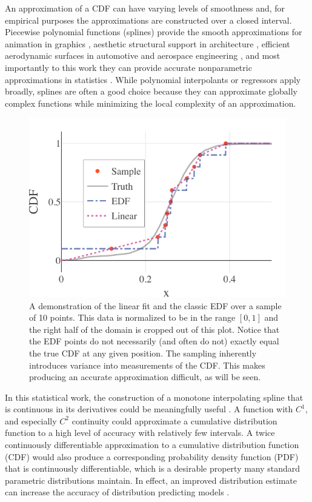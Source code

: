 \documentclass[letterpaper, 10 pt, conference]{ieeeconf}  %
\begin{document}
An approximation of a CDF can have varying levels of smoothness and, for empirical purposes the approximations are constructed over a closed interval. Piecewise polynomial functions (splines) provide the smooth approximations for animation in graphics \cite{herman2015techniques,quint2003scalable}, aesthetic structural support in architecture \cite{brennan2019measure}, efficient aerodynamic surfaces in automotive and aerospace engineering \cite{brennan2019measure}, and most importantly to this work they can provide accurate nonparametric approximations in statistics \cite{knott2012interpolating}. While polynomial interpolants or regressors apply broadly, splines are often a good choice because they can approximate globally complex functions while minimizing the local complexity of an approximation.

\begin{figure}
  \vspace{-.3cm}
  \includegraphics[width=.5\textwidth]{fl-sample-prediction.pdf}
  \caption{A demonstration of the linear fit and the classic EDF over a sample of 10 points. This data is normalized to be in the range $[0,1]$ and the right half of the domain is cropped out of this plot. Notice that the EDF points do not necessarily (and often do not) exactly equal the true CDF at any given position. The sampling inherently introduces variance into measurements of the CDF. This makes producing an accurate approximation difficult, as will be seen.
  \vspace{-.5cm}}
  \label{fig:sample-prediction}
\end{figure}

In this statistical work, the construction of a monotone interpolating spline that is continuous in its derivatives could be meaningfully useful \cite{ramsay1988monotone}. A function with $C^1$, and especially $C^2$ continuity could approximate a cumulative distribution function to a high level of accuracy with relatively few intervals. A twice continuously differentiable approximation to a cumulative distribution function (CDF) would also produce a corresponding probability density function (PDF) that is continuously differentiable, which is a desirable property many standard parametric distributions maintain. In effect, an improved distribution estimate can increase the accuracy of distribution predicting models \cite{xu2020modeling}.
\end{document}
